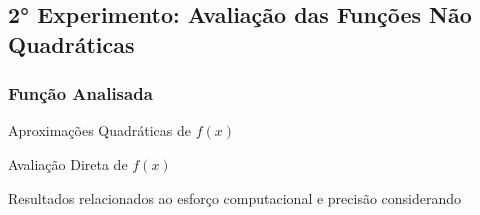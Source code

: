 

\subsection{2° Experimento: Avaliação das Funções Não Quadráticas}
    \subsubsection{Função Analisada}
        \begin{table}[h!]{\linewidth}
            \begin{subtable}[h!]{0.45\textwidth} 
                {Aproximações Quadráticas de $f(x)$}
                \label{tab:tblh} 
                \writetable{\tblh}               
            \end{subtable}
            \bigskip
         
            \begin{subtable}[h!]{0.45\textwidth}
                {Avaliação Direta de $f(x)$}
                \label{tab:tbli} 
                \writetable{\tbli}        
            \end{subtable}
            \caption{Resultados relacionados ao esforço computacional e precisão considerando}
        \end{table}
         
\newpage    